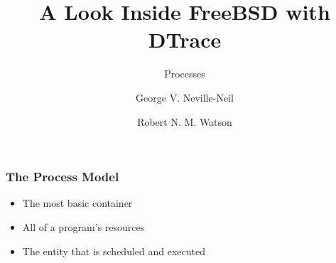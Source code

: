 \documentclass[pdftex]{beamer}
\begin{document}

\title{A Look Inside FreeBSD with DTrace}
\subtitle{Processes}
\author[shortname]{George V. Neville-Neil \and Robert N. M. Watson}

\begin{frame}
  \titlepage
\end{frame}

\begin{frame}
  \frametitle{The Process Model}
  \begin{itemize}
  \item The most basic container
  \item All of a program's resources
  \item The entity that is scheduled and executed
  \end{itemize}
\end{frame}
\end{document}
